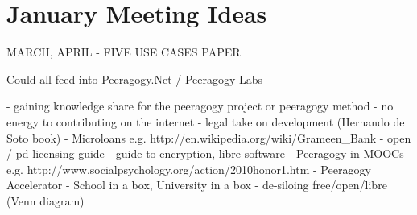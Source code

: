 \section{January Meeting Ideas}

MARCH, APRIL - FIVE USE CASES PAPER

Could all feed into Peeragogy.Net / Peeragogy Labs

  - gaining knowledge share for the peeragogy project or peeragogy method
  - no energy to contributing on the internet
  - legal take on development (Hernando de Soto book)
  - Microloans e.g. http://en.wikipedia.org/wiki/Grameen_Bank
  - open / pd licensing guide
  - guide to encryption, libre software
  - Peeragogy in MOOCs e.g. http://www.socialpsychology.org/action/2010honor1.htm
    - Peeragogy Accelerator
  - School in a box, University in a box
  - de-siloing free/open/libre (Venn diagram)